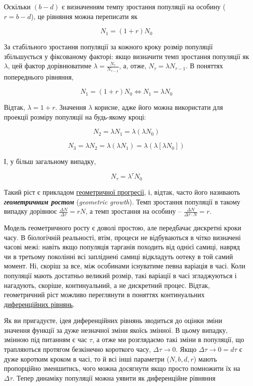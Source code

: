 \documentclass[
  11pt,
]{book}
\begin{document}
Оскільки \((b-d)\) є визначенням темпу зростання популяції на особину (\(r=b-d\)), це рівняння можна переписати як

\[N_1 = (1+r)N_0\]

За стабільного зростання популяції за кожного кроку розмір популяції збільшується у фіксованому факторі: якщо визначити темп зростання популяції як \(\lambda\), цей фактор дорівнюватиме \(\lambda = \frac{N_{\tau}}{N_{\tau-1}}\), а, отже, \(N_\tau = \lambda N_{\tau-1}\). В поняттях попереднього рівняння,

\[N_1 = (1+r)N_0 \Leftrightarrow N_1 = \lambda N_0\]

Відтак, \(\lambda = 1+r\). Значення \(\lambda\) корисне, адже його можна використати для проекції розміру популяції на будь-якому кроці:

\[N_2 = \lambda N_1 = \lambda (\lambda N_0)\]

\[N_3 = \lambda N_2 = \lambda (\lambda N_1) = \lambda(\lambda[\lambda N_0])\]

І, у більш загальному випадку,

\[N_\tau = \lambda^\tau N_0\]

Такий ріст є прикладом \hyperref[algebra]{геометричної прогресії}, і, відтак, часто його називають \textbf{\emph{геометричним ростом}} (\emph{geometric growth}). Темп зростання популяції в такому випадку дорівнює \(\frac{\Delta N}{\Delta \tau} = rN\), а темп зростання на особину -- \(\frac{\Delta N}{\Delta \tau \cdot N} = r\).

Модель геометричного росту є доволі простою, але передбачає дискретні кроки часу. В біологічній реальності, втім, процеси не відбуваються в чітко визначені часові межі: навіть якщо популяція тарганів походить від однієї самиці, навряд чи в третьому поколінні всі запліднені самиці відкладуть оотеку в той самий момент. Ні, скоріш за все, між особинами існуватиме певна варіація в часі. Коли популяції мають достатньо великий розмір, такі варіації в часі згладжуються і нагадують, скоріше, континуальний, а не дискретний процес. Відтак, геометричний ріст можливо переглянути в поняттях континуальних \hyperref[algebra]{диференційних рівнянь}.

Як ви пригадуєте, ідея диференційних рівнянь зводиться до оцінки зміни значення функції за дуже незначної зміни якоїсь змінної. В цьому випадку, змінною під питанням є час \(\tau\), а отже ми розглядаємо такі зміни в популяції, що трапляються протягом безкінечно короткого часу, \(\Delta \tau \rightarrow 0\). Якщо \(\Delta \tau \rightarrow 0 = d\tau\) є дуже коротким кроком в часі, то й всі інші параметри (\(N, b, d, r\)) мають пропорційно зменшитись, чого можна досягнути якщо просто помножити їх на \(\Delta \tau\). Тепер динаміку популяції можна уявити як диференційне рівняння
\end{document}
